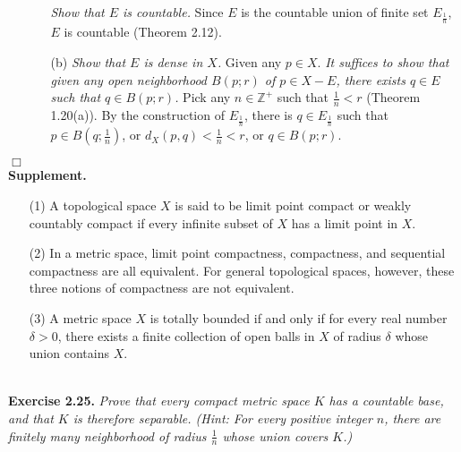 \documentclass{article}
\begin{document}
\begin{enumerate}
\begin{enumerate}
  \emph{Show that $E$ is countable.}
  Since $E$ is the countable union of finite set $E_{\frac{1}{n}}$,
  $E$ is countable (Theorem 2.12).
  \item[(b)]
  \emph{Show that $E$ is dense in $X$.}
  Given any $p \in X$.
  \emph{It suffices to show that given any open neighborhood $B(p;r)$ of $p \in X-E$,
  there exists $q \in E$ such that $q \in B(p;r)$.}
  Pick any $n \in \mathbb{Z}^+$ such that $\frac{1}{n} < r$ (Theorem 1.20(a)).
  By the construction of $E_{\frac{1}{n}}$,
  there is $q  \in E_{\frac{1}{n}}$ such that $p \in B\left(q;\frac{1}{n}\right)$,
  or $d_X(p,q) < \frac{1}{n} < r$, or $q \in  B(p;r)$.
  \end{enumerate}
\end{enumerate}
$\Box$ \\



\textbf{Supplement.}
\begin{enumerate}
\item[(1)]
A topological space $X$ is said to be limit point compact or weakly countably compact if every infinite subset of $X$ has a limit point in $X$.
\item[(2)]
In a metric space, limit point compactness, compactness, and sequential compactness are
all equivalent.
For general topological spaces, however, these three notions of compactness are not equivalent.
\item[(3)]
A metric space $X$ is totally bounded if and only if for every real number $\delta >0$,
there exists a finite collection of open balls in $X$ of radius $\delta$
whose union contains $X$. \\\\
\end{enumerate}






\textbf{Exercise 2.25.}
\emph{Prove that every compact metric space $K$ has a countable base,
and that $K$ is therefore separable.
(Hint: For every positive integer $n$,
there are finitely many neighborhood of radius $\frac{1}{n}$ whose union
covers $K$.)} \\
\end{document}
